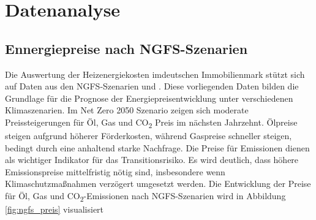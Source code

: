 \section{Datenanalyse}\label{sec:createportfolio}





\subsection{Ennergiepreise nach NGFS-Szenarien}\label{sec:ngfs_preis}
Die Auswertung der Heizenergiekosten imdeutschen Immobilienmark  stützt sich auf Daten aus den \ac{NGFS}-Szenarien und \textcite{imf2022}. Diese vorliegenden Daten bilden die Grundlage für die Prognose der Energiepreisentwicklung unter verschiedenen Klimaszenarien. Im Net Zero 2050 Szenario zeigen sich moderate Preissteigerungen für Öl, Gas und CO\textsubscript{2} Preis im nächsten Jahrzehnt. Ölpreise steigen aufgrund höherer Förderkosten, während Gaspreise schneller steigen, bedingt durch eine anhaltend starke Nachfrage. Die Preise für Emissionen dienen als wichtiger Indikator für das Transitionsrisiko. Es wird deutlich, dass höhere Emissionspreise mittelfristig nötig sind, insbesondere wenn Klimaschutzmaßnahmen verzögert umgesetzt werden.
Die Entwicklung der Preise für Öl, Gas und CO\textsubscript{2}-Emissionen nach \ac{NGFS}-Szenarien wird in Abbildung \ref{fig:ngfs_preis} visualisiert
